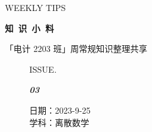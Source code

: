 \documentclass[UTF8]{ctexart}
\newcommand\Black[1]{\textcolor[gray]{0.3}{#1}}
\newcommand\Brown[1]{\textcolor[HTML]{998A4E}{#1}}
\newcommand\IssueNumber{03}
\newcommand\Date{2023-9-25}
\newcommand\Subject{离散数学}
\begin{document}
\BgThispage
\begin{center}
{\scriptsize\Issue \textcolor[HTML]{C8BA83}{WEEKLY TIPS}}

{\Huge\bfseries\TitleFont \Black{知\ 识\ 小\ 料}}

\vspace{-0.1cm}
{\footnotesize \Brown{「电计 2203 班」周常规知识整理共享}}
\end{center}

\vspace{-0.5cm}

\begin{figure}[H]
\hspace{1cm}
\begin{minipage}[t]{0.3\textwidth}
\centering
    \Brown{ISSUE.}

    \vspace{-0.6cm}
    \Huge \Issue\slshape\bfseries\Black{\IssueNumber}
\end{minipage}
\hfill
\begin{minipage}[t]{0.3\textwidth}
\centering
    \Brown{日期：\Date} \\
\vspace{-0.1cm}
    \Brown{学科：\Subject} \\
\end{minipage}
\hspace{0.8cm}
\end{figure}
\end{document}
